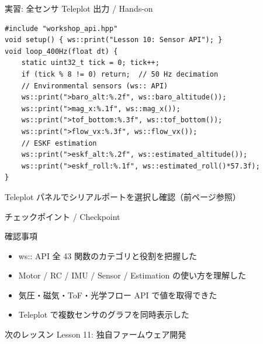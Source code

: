 \begin{frame}[fragile]{実習: 全センサ Teleplot 出力 / Hands-on}
  \begin{lstlisting}[style=sfcpp, basicstyle=\ttfamily\scriptsize]
#include "workshop_api.hpp"
void setup() { ws::print("Lesson 10: Sensor API"); }
void loop_400Hz(float dt) {
    static uint32_t tick = 0; tick++;
    if (tick % 8 != 0) return;  // 50 Hz decimation
    // Environmental sensors (ws:: API)
    ws::print(">baro_alt:%.2f", ws::baro_altitude());
    ws::print(">mag_x:%.1f", ws::mag_x());
    ws::print(">tof_bottom:%.3f", ws::tof_bottom());
    ws::print(">flow_vx:%.3f", ws::flow_vx());
    // ESKF estimation
    ws::print(">eskf_alt:%.2f", ws::estimated_altitude());
    ws::print(">eskf_roll:%.1f", ws::estimated_roll()*57.3f);
}
  \end{lstlisting}

  \vspace{0.2em}
  {\footnotesize
    Teleplot パネルでシリアルポートを選択し確認（前ページ参照）
  }
\end{frame}

\begin{frame}{チェックポイント / Checkpoint}
  \begin{alertblock}{確認事項}
    \begin{itemize}
      \item[$\square$] ws:: API 全 43 関数のカテゴリと役割を把握した
      \item[$\square$] Motor / RC / IMU / Sensor / Estimation の使い方を理解した
      \item[$\square$] 気圧・磁気・ToF・光学フロー API で値を取得できた
      \item[$\square$] Teleplot で複数センサのグラフを同時表示した
    \end{itemize}
  \end{alertblock}

  \vspace{0.5em}

  \begin{block}{次のレッスン}
    Lesson 11: 独自ファームウェア開発
  \end{block}
\end{frame}
